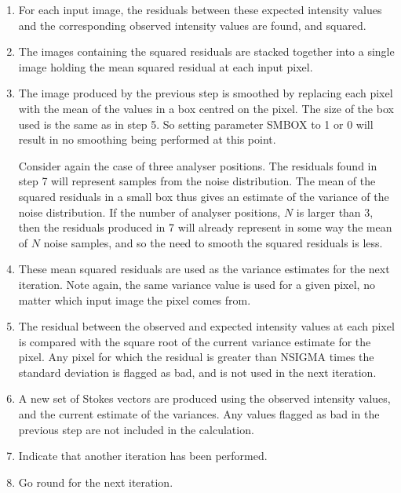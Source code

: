 \documentclass[twoside,11pt]{article}
\renewcommand{\_}{\texttt{\symbol{95}}}
\begin{document}
\begin{enumerate}
\item For each input image, the residuals between these expected intensity 
values and the corresponding observed intensity values are found, and squared.

\item The images containing the squared residuals are stacked together
into a single image holding the mean squared residual at each input pixel.

\item The image produced by the previous step is smoothed by replacing
each pixel with the mean of the values in a box centred on the pixel.
The size of the box used is the same as in step 5. So setting
parameter SMBOX to 1 or 0 will result in no smoothing being performed
at this point.

Consider again the case of three analyser positions. The residuals found in
step 7 will represent samples from the noise distribution. The
mean of the squared residuals in a small box thus gives an estimate of the 
variance of the noise distribution. If the number of analyser positions,
$N$ is larger than 3, then the residuals produced in 7 will already
represent in some way the mean of $N$ noise samples, and so the need to
smooth the squared residuals is less. 

\item These mean squared residuals are used as the variance estimates
for the next iteration. Note again, the same variance value is used for
a given pixel, no matter which input image the pixel comes from.

\item The residual between the observed and expected intensity values at
each pixel is compared with the square root of the current variance estimate 
for the pixel. Any pixel for which the residual is greater than NSIGMA
times the standard deviation is flagged as bad, and is not used in the
next iteration.

\item A new set of Stokes vectors are produced using the observed
intensity values, and the current estimate of the variances. Any values
flagged as bad in the previous step are not included in the calculation.

\item Indicate that another iteration has been performed.

\item Go round for the next iteration.

\end{enumerate}
\end{document}
